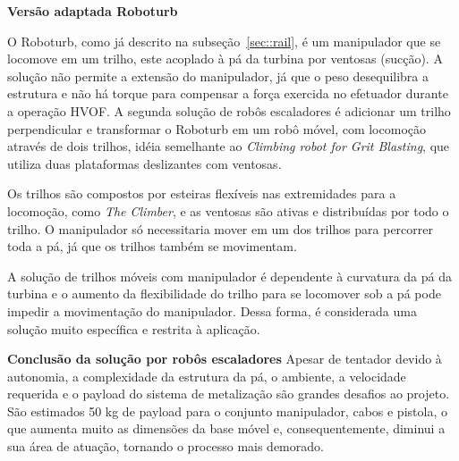 \textbf{Versão adaptada Roboturb}

O Roboturb, como já descrito na subseção~\ref{sec::rail}, é um
manipulador que se locomove em um trilho, este acoplado à pá da turbina
por ventosas (sucção). A solução não permite a extensão
do manipulador, já que o peso desequilibra a estrutura e não há torque para
compensar a força exercida no efetuador durante a operação HVOF. A segunda
solução de robôs escaladores é adicionar um trilho perpendicular e transformar
o Roboturb em um robô móvel, com locomoção através de dois trilhos, idéia
semelhante ao \emph{Climbing robot for Grit Blasting}, que utiliza duas
plataformas deslizantes com ventosas.

Os trilhos são compostos por esteiras flexíveis nas extremidades para a
locomoção, como \emph{The Climber}, e as ventosas são ativas e distribuídas por
todo o trilho. O manipulador só necessitaria mover em um dos trilhos para
percorrer toda a pá, já que os trilhos também se movimentam. 

A solução de trilhos móveis com manipulador é dependente à curvatura da pá da
turbina e o aumento da flexibilidade do trilho para se locomover sob a pá pode
impedir a movimentação do manipulador. Dessa forma, é considerada uma solução
muito específica e restrita à aplicação.

\textbf{Conclusão da solução por robôs escaladores}
Apesar de tentador devido à autonomia, a complexidade da estrutura da pá, o
ambiente, a velocidade requerida e o payload do sistema de metalização são
grandes desafios ao projeto. São estimados 50 kg de
payload para o conjunto manipulador, cabos e pistola, o que aumenta muito as
dimensões da base móvel e, consequentemente, diminui a sua área de atuação,
tornando o processo mais demorado.

